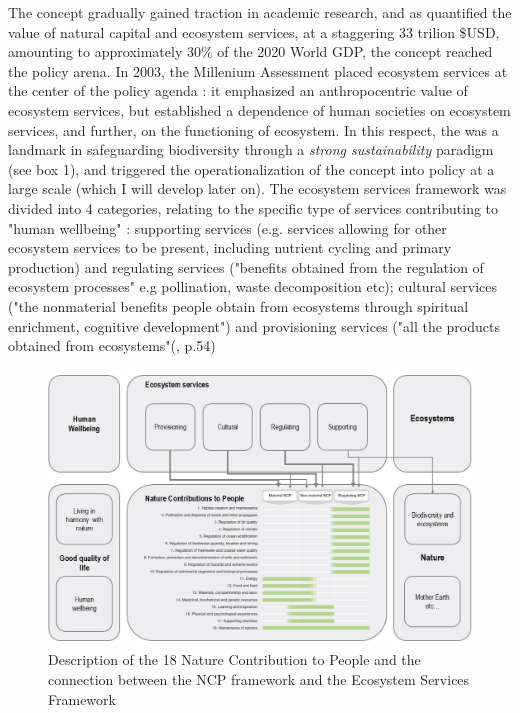 The concept gradually gained traction in academic research, and as \cite{Costanza1997} quantified the value of natural capital and ecosystem services, at a staggering 33 trilion \$USD, amounting to approximately 30\% of the 2020 World GDP, the concept reached the policy arena. In 2003, the Millenium Assessment placed ecosystem services at the center of the policy agenda : it emphasized an anthropocentric value of ecosystem services, but established a dependence of human societies on ecosystem services, and further, on the functioning of ecosystem. In this respect, the \cite{millennium2005ecosystems} was a landmark in safeguarding biodiversity through a \textit{strong sustainability} paradigm (see box 1), and triggered the operationalization of the concept into policy at a large scale (which I will develop later on). The ecosystem services framework was divided into 4 categories, relating to the specific type of services contributing to "human wellbeing" : supporting services (e.g. services allowing for other ecosystem services to be present, including nutrient cycling and primary production) and regulating services ("benefits obtained from the regulation of ecosystem processes" e.g pollination, waste decomposition etc); cultural services ("the nonmaterial benefits people obtain from ecosystems through spiritual enrichment, cognitive development") and provisioning services ("all the products obtained from ecosystems"(\cite{millennium2005ecosystems}, p.54)

\begin{figure}[h]
	\centering
	\includegraphics[width = \textwidth]{figures/intro/NCPs2.jpg}
	\caption{Description of the 18 Nature Contribution to People and the connection between the NCP framework \citep{ipbes_2022_6417333} and the Ecosystem Services Framework \citep{millennium2005ecosystems}}
\end{figure}

